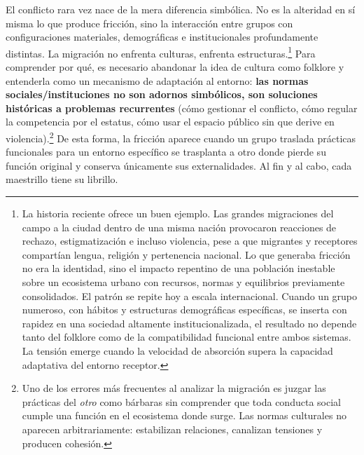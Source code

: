\documentclass[10pt,a4paper]{article}
\begin{document}
El conflicto rara vez nace de la mera diferencia simbólica. No es la alteridad en sí misma lo que produce fricción, sino la interacción entre grupos con configuraciones materiales, demográficas e institucionales profundamente distintas. La migración no enfrenta culturas, enfrenta estructuras.\footnote{%
    La historia reciente ofrece un buen ejemplo. Las grandes migraciones del campo a la ciudad dentro de una misma nación provocaron reacciones de rechazo, estigmatización e incluso violencia, pese a que migrantes y receptores compartían lengua, religión y pertenencia nacional. Lo que generaba fricción no era la identidad, sino el impacto repentino de una población inestable sobre un ecosistema urbano con recursos, normas y equilibrios previamente consolidados. El patrón se repite hoy a escala internacional. Cuando un grupo numeroso, con hábitos y estructuras demográficas específicas, se inserta con rapidez en una sociedad altamente institucionalizada, el resultado no depende tanto del folklore como de la compatibilidad funcional entre ambos sistemas. La tensión emerge cuando la velocidad de absorción supera la capacidad adaptativa del entorno receptor.
} Para comprender por qué, es necesario abandonar la idea de cultura como folklore y entenderla como un mecanismo de adaptación al entorno: \textbf{las normas sociales/instituciones no son adornos simbólicos, son soluciones históricas a problemas recurrentes} (cómo gestionar el conflicto, cómo regular la competencia por el estatus, cómo usar el espacio público sin que derive en violencia).\footnote{%
    Uno de los errores más frecuentes al analizar la migración es juzgar las prácticas del \textit{otro} como bárbaras sin comprender que toda conducta social cumple una función en el ecosistema donde surge. Las normas culturales no aparecen arbitrariamente: estabilizan relaciones, canalizan tensiones y producen cohesión.
} De esta forma, la fricción aparece cuando un grupo traslada prácticas funcionales para un entorno específico se trasplanta a otro donde pierde su función original y conserva únicamente sus externalidades. Al fin y al cabo, cada maestrillo tiene su librillo. 
\end{document}

